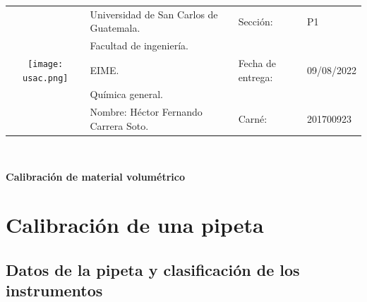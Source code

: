 \documentclass[12pt,letterpaper]{exam}
\begin{document}
\begin{title}

\begin{table}[]
\begin{tabular}{cllll}
\multirow{5}{*}{\texttt{[image: usac.png]}} & Universidad de San Carlos de Guatemala.    &  & Sección:         & P1 \\
    & Facultad de ingeniería.                    &  &                  &            \\
    & EIME. 									 &  & Fecha de entrega:& 09/08/2022 \\
    & Química general.        &  &                  &            \\
    & Nombre: Héctor Fernando Carrera Soto.      &  & Carné:           & 201700923
\end{tabular}
\\
\begin{huge}
\begin{center}
\textbf{Calibración de material volumétrico}
\end{center}
\end{huge}

\end{table}

\end{title}

\headrule




\section{Calibración de una pipeta}

\subsection{Datos de la pipeta y clasificación de los instrumentos}
\end{document}
